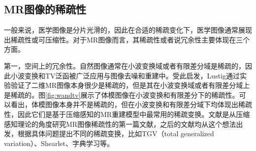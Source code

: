 \subsection{MR图像的稀疏性}
\label{sec:sparsity}
一般来说，医学图像是分片光滑的，因此在合适的稀疏变化下，医学图像通常展现出稀疏性或可压缩性。对于MR图像而言，其稀疏性或者说冗余性主要体现在三个方面。

第一，空间上的冗余性。自然图像通常在小波变换域或者有限差分域是稀疏的，因此小波变换和TV泛函被广泛应用与图像去噪和重建中。受此启发，Lustig\cite{lustig2006}通过实验验证了二维MR图像本身很少是稀疏的，但是其在小波变换域或者有限差分域上是稀疏的。图\ref{fig:wandtv}展示了体模图像在小波变换和有限差分下的稀疏性。可以看出，体模图像本身并不是稀疏的，但在小波变换和有限差分域下均体现出稀疏性，因此它们是基于压缩感知的MR重建模型中最常用的稀疏变换。文献\cite{lustig2006}是从压缩感知理论的角度研究MR图像稀疏性的第一篇文献，之后的文献均从这个想法出发，根据具体问题提出不同的稀疏变换，比如TGV（total generalized variation）\cite{tgv}、Shearlet\cite{easley2008sparse}、字典学习\cite{ksvd}等。

